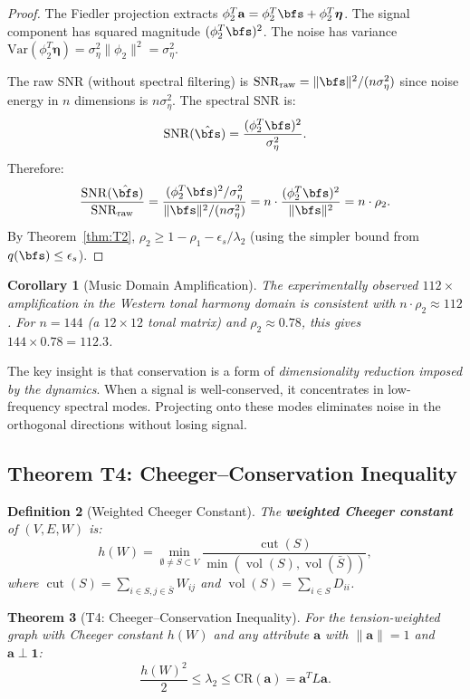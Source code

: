 \documentclass[12pt,letterpaper]{article}
\newtheorem{theorem}{Theorem}[section]
\newtheorem{corollary}[theorem]{Corollary}
\newtheorem{definition}[theorem]{Definition}
\newcommand{\One}{\mathbf{1}}
\newcommand{\bfa}{\mathbf{a}}
\newcommand{\CR}{\mathrm{CR}}
\newcommand{\vol}{\operatorname{vol}}
\newcommand{\cut}{\operatorname{cut}}
\begin{document}
\begin{proof}
The Fiedler projection extracts $\phi_2^T \bfa = \phi_2^T \bfs + \phi_2^T \boldsymbol{\eta}$. The signal component has squared magnitude $(\phi_2^T \bfs)^2$. The noise has variance $\mathrm{Var}(\phi_2^T \boldsymbol{\eta}) = \sigma_\eta^2 \|\phi_2\|^2 = \sigma_\eta^2$.

The raw SNR (without spectral filtering) is $\mathrm{SNR}_{\mathrm{raw}} = \|\bfs\|^2 / (n\sigma_\eta^2)$ since noise energy in $n$ dimensions is $n\sigma_\eta^2$. The spectral SNR is:
\[
  \mathrm{SNR}(\hat{\bfs}) = \frac{(\phi_2^T \bfs)^2}{\sigma_\eta^2}.
\]
Therefore:
\[
  \frac{\mathrm{SNR}(\hat{\bfs})}{\mathrm{SNR}_{\mathrm{raw}}} = \frac{(\phi_2^T \bfs)^2/\sigma_\eta^2}{\|\bfs\|^2/(n\sigma_\eta^2)} = n \cdot \frac{(\phi_2^T \bfs)^2}{\|\bfs\|^2} = n \cdot \rho_2.
\]
By Theorem~\ref{thm:T2}, $\rho_2 \geq 1 - \rho_1 - \epsilon_s/\lambda_2$ (using the simpler bound from $q(\bfs) \leq \epsilon_s$).
\end{proof}

\begin{corollary}[Music Domain Amplification]
\label{cor:music}
The experimentally observed $112\times$ amplification in the Western tonal harmony domain is consistent with $n \cdot \rho_2 \approx 112$. For $n = 144$ (a $12 \times 12$ tonal matrix) and $\rho_2 \approx 0.78$, this gives $144 \times 0.78 = 112.3$.
\end{corollary}

The key insight is that conservation is a form of \emph{dimensionality reduction imposed by the dynamics}. When a signal is well-conserved, it concentrates in low-frequency spectral modes. Projecting onto these modes eliminates noise in the orthogonal directions without losing signal.

\subsection{Theorem T4: Cheeger--Conservation Inequality}
\label{sec:T4}

\begin{definition}[Weighted Cheeger Constant]
\label{def:cheeger}
The \textbf{weighted Cheeger constant} of $(V, E, W)$ is:
\[
  h(W) = \min_{\emptyset \neq S \subset V} \frac{\cut(S)}{\min(\vol(S), \vol(\bar{S}))},
\]
where $\cut(S) = \sum_{i \in S, j \in \bar{S}} W_{ij}$ and $\vol(S) = \sum_{i \in S} D_{ii}$.
\end{definition}

\begin{theorem}[T4: Cheeger--Conservation Inequality]
\label{thm:T4}
For the tension-weighted graph with Cheeger constant $h(W)$ and any attribute $\bfa$ with $\|\bfa\| = 1$ and $\bfa \perp \One$:
\begin{equation}
\label{eq:T4}
  \frac{h(W)^2}{2} \leq \lambda_2 \leq \CR(\bfa) = \bfa^T L \bfa.
\end{equation}
\end{theorem}
\end{document}
